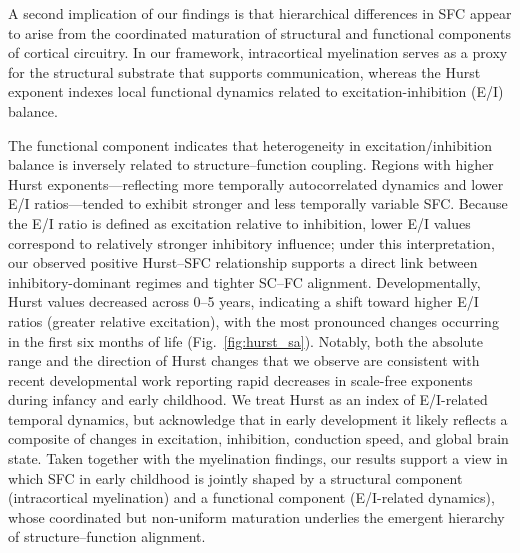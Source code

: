 A second implication of our findings is that hierarchical differences in SFC appear to arise from the coordinated maturation of structural and functional components of cortical circuitry. In our framework, intracortical myelination serves as a proxy for the structural substrate that supports communication, whereas the Hurst exponent indexes local functional dynamics related to excitation-inhibition (E/I) balance.

The functional component indicates that heterogeneity in excitation/inhibition balance is inversely related to structure--function coupling. Regions with higher Hurst exponents---reflecting more temporally autocorrelated dynamics and lower E/I ratios---tended to exhibit stronger and less temporally variable SFC. Because the E/I ratio is defined as excitation relative to inhibition, lower E/I values correspond to relatively stronger inhibitory influence; under this interpretation, our observed positive Hurst--SFC relationship supports a direct link between inhibitory-dominant regimes and tighter SC--FC alignment. Developmentally, Hurst values decreased across 0--5 years, indicating a shift toward higher E/I ratios (greater relative excitation), with the most pronounced changes occurring in the first six months of life (Fig.~\ref{fig:hurst_sa}). Notably, both the absolute range and the direction of Hurst changes that we observe are consistent with recent developmental work reporting rapid decreases in scale-free exponents during infancy and early childhood\cite{stanyardAperiodicHurstEEG2024a,houtmanSTXBP1SyndromeCharacterized2021,nishioHurstExponentMarker2024}. We treat Hurst as an index of E/I-related temporal dynamics, but acknowledge that in early development it likely reflects a composite of changes in excitation, inhibition, conduction speed, and global brain state. Taken together with the myelination findings, our results support a view in which SFC in early childhood is jointly shaped by a structural component (intracortical myelination) and a functional component (E/I-related dynamics), whose coordinated but non-uniform maturation underlies the emergent hierarchy of structure--function alignment.
